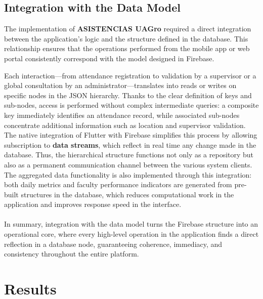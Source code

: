 \documentclass[journal=information,article,submit,pdftex,oneauthor]{Definitions/mdpi}
\begin{document}
\subsection{Integration with the Data Model}

The implementation of \textbf{ASISTENCIAS UAGro} required a direct integration between the application's logic and the structure defined in the database. This relationship ensures that the operations performed from the mobile app or web portal consistently correspond with the model designed in Firebase.

Each interaction—from attendance registration to validation by a supervisor or a global consultation by an administrator—translates into reads or writes on specific nodes in the JSON hierarchy. Thanks to the clear definition of keys and sub-nodes, access is performed without complex intermediate queries: a composite key immediately identifies an attendance record, while associated sub-nodes concentrate additional information such as location and supervisor validation. The native integration of Flutter with Firebase simplifies this process by allowing subscription to \textbf{data streams}, which reflect in real time any change made in the database. Thus, the hierarchical structure functions not only as a repository but also as a permanent communication channel between the various system clients. The aggregated data functionality is also implemented through this integration: both daily metrics and faculty performance indicators are generated from pre-built structures in the database, which reduces computational work in the application and improves response speed in the interface.\\
\\
In summary, integration with the data model turns the Firebase structure into an operational core, where every high-level operation in the application finds a direct reflection in a database node, guaranteeing coherence, immediacy, and consistency throughout the entire platform.
	
	
	\section{Results}
	
	
	
\end{document}
